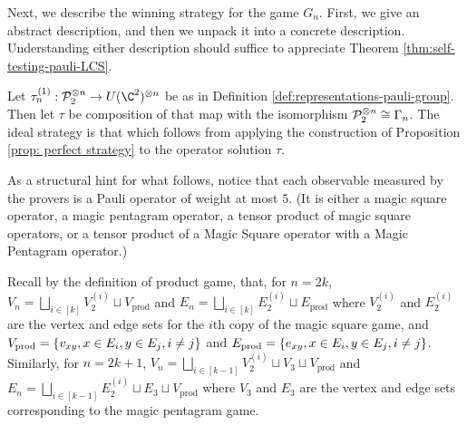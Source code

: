 Next, we describe the winning strategy for the game $G_n$. First, we give an abstract description, and then we unpack it into a concrete description. Understanding either description should suffice to appreciate Theorem \ref{thm:self-testing-pauli-LCS}.

\begin{definition}
	Let $\tau_n^{(1)}: \mathcal{P}_2^{\otimes n}\to U(\C^2)^{\otimes n}$ be as in Definition \ref{def:representations-pauli-group}. Then let $\tau$ be composition of that map with the isomorphism $\mathcal{P}_2^{\otimes n}\cong \Gamma_n$. The ideal strategy is that which follows from applying the construction of Proposition \ref{prop: perfect strategy} to the operator solution $\tau$.
\end{definition}

As a structural hint for what follows, notice that each observable measured by the provers is a Pauli operator of weight at most $5$. (It is either a magic square operator, a magic pentagram operator, a tensor product of magic square operators, or a tensor product of a Magic Square operator with a Magic Pentagram operator.) 

Recall by the definition of product game, that, for $n = 2k$, $V_n = \bigsqcup_{i \in [k]} V_2^{(i)} \sqcup V_\text{prod}$ and $E_n = \bigsqcup_{i \in [k]} E_2^{(i)} \sqcup E_\text{prod}$ where $V_2^{(i)}$ and $E_2^{(i)}$ are the vertex and edge sets for the $i$th copy of the magic square game, and $V_\text{prod} = \left\{v_{xy}, x\in E_i, y\in E_j, i\neq j\right\}$ and $E_\text{prod} = \left\{e_{xy}, x\in E_i, y\in E_j, i\neq j\right\}$. Similarly, for $n=2k+1$, $V_n = \bigsqcup_{i \in [k-1]} V_2^{(i)} \sqcup V_3 \sqcup V_\text{prod}$ and $E_n = \bigsqcup_{i \in [k-1]} E_2^{(i)} \sqcup E_3 \sqcup V_\text{prod}$ where $V_3$ and $E_3$ are the vertex and edge sets corresponding to the magic pentagram game. 

